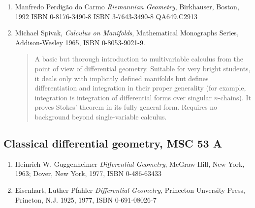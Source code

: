 \documentclass[12pt]{article}
\begin{document}
\begin{enumerate}
\begin{quote}
\end{quote}
\item Manfredo Perdig\~ao do Carmo \emph{Riemannian Geometry},
Birkhauser, Boston, 1992 ISBN 0-8176-3490-8 ISBN 3-7643-3490-8 QA649.C2913
\item Michael Spivak, \emph{Calculus on Manifolds}, Mathematical Monographs Series, Addison-Wesley 1965, ISBN 0-8053-9021-9.
\begin{quote} 
A basic but thorough introduction to multivariable calculus from the point of view of differential geometry.  Suitable for very bright students, it deals only with implicitly defined manifolds but defines differentiation and integration in their proper generality (for example, integration is integration of differential forms over singular $n$-chains).  It proves Stokes' theorem in its fully general form.  Requires no background beyond single-variable calculus.
\end{quote}
\end{enumerate}


\subsection*{Classical differential geometry, MSC 53 A}

\begin{enumerate}
\item Heinrich W. Guggenheimer \emph{Differential Geometry}, McGraw-Hill, New York, 1963; Dover, New York, 1977, ISBN 0-486-63433
\item Eisenhart, Luther Pfahler \emph{Differential Geometry}, Princeton Unversity Press, Princton, N.J. 1925, 1977, ISBN 0-691-08026-7
\end{enumerate}
\end{document}
